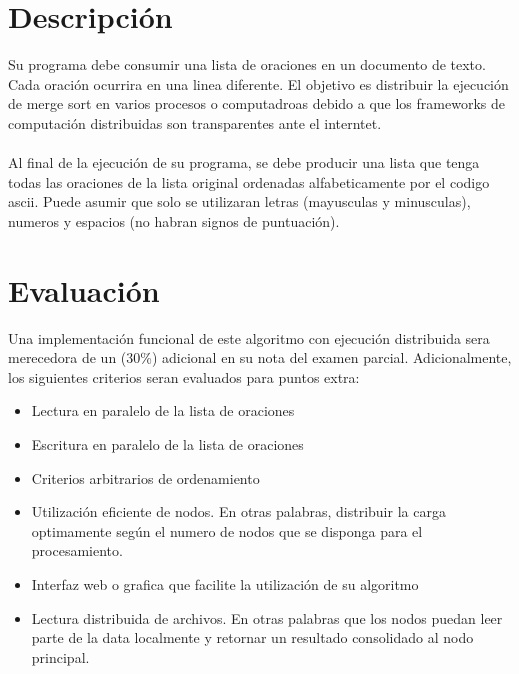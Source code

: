 \documentclass{article}
\begin{document}
\section*{Descripci\'on}
Su programa debe consumir una lista de oraciones en un documento de texto. Cada oraci\'on
ocurrira en una linea diferente. El objetivo es distribuir la ejecuci\'on de merge
sort en varios procesos o computadroas debido a que los frameworks de computaci\'on
distribuidas son transparentes ante el interntet.
\\\\
Al final de la ejecuci\'on de su programa, se debe producir una lista que tenga
todas las oraciones de la lista original ordenadas alfabeticamente por el codigo
ascii. Puede asumir que solo se utilizaran letras (mayusculas y minusculas), numeros
y espacios (no habran signos de puntuaci\'on).

\section*{Evaluaci\'on}
Una implementaci\'on funcional de este algoritmo con ejecuci\'on distribuida
sera merecedora de un (30\%) adicional en su nota del examen parcial. Adicionalmente,
los siguientes criterios seran evaluados para puntos extra:
\begin{itemize}
        \item{Lectura en paralelo de la lista de oraciones}
        \item{Escritura en paralelo de la lista de oraciones}
        \item{Criterios arbitrarios de ordenamiento}
        \item{Utilizaci\'on eficiente de nodos. En otras palabras,
        distribuir la carga optimamente seg\'un el numero de nodos
        que se disponga para el procesamiento.}
        \item{Interfaz web o grafica que facilite la utilizaci\'on
        de su algoritmo}
        \item{Lectura distribuida de archivos. En otras palabras que
        los nodos puedan leer parte de la data localmente y retornar
        un resultado consolidado al nodo principal.}
\end{itemize}
\end{document}
